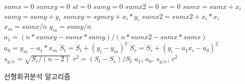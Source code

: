 \begin{algorithm}

\begin{algorithmic}
\State $sumx=0$\; $sumxy=0$\; $st=0$\;
\State $sumy=0$\; $sumx2=0$\; $sr=0$\;
 \State $sumx=sumx+x_{i}$\;
 \State $sumy=sumy+y_{i}$\;
 \State $sumxy=symxy+x_{i}*y_{i}$\;
 \State $sumx2=sumx2+x_{i}*x_{i}$\;
\EndFor
\State $x_{m}=sumx/n$\;
\State $y_{m}=sumy/n$\;
\State $a_{1}=(n*sumxy-sumx*sumy)/(n*sumx2-sumx*sumx)$\;
\State $a_{0}=y_{m}-a_{1}*x_{m}$\;
 \State $S_{t}=S_{t}+(y_{i}-y_{m})^{2}$\;
 \State $S_{r}=S_{r}+(y_{i}-a_{1}x_{i}-a_{0})^{2}$\;
\EndFor
\State $s_{y/x}=\sqrt{S_{r}/(n-2)}$\;
\State $r^{2}=(S_{t}-S_{r})/S_{t}$\;
\State \Return $a_{1}$, $a_{0}$, $s_{y/x}$, $r^2$
\EndFunction
\end{algorithmic}
\caption{선형회귀분석 알고리즘}
\end{algorithm}
%
%
%

